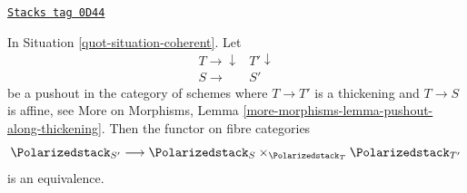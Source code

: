\begin{lemma}
\label{quot-lemma-polarized-RS-star}
\href{https://stacks.math.columbia.edu/tag/0D44}{\texttt{Stacks tag 0D44}}

In Situation \ref{quot-situation-coherent}. Let
$$
\begin{array}{cc}T \longrightarrow\downarrow & T' \downarrow \\ S \longrightarrow & S'\end{array}
$$
be a pushout in the category of schemes where
$T \to T'$ is a thickening and $T \to S$ is affine, see
More on Morphisms, Lemma \ref{more-morphisms-lemma-pushout-along-thickening}.
Then the functor on fibre categories
$$
\Polarizedstack_{S'}
\longrightarrow
\Polarizedstack_S \times_{\Polarizedstack_T} \Polarizedstack_{T'}
$$
is an equivalence.
\end{lemma}


